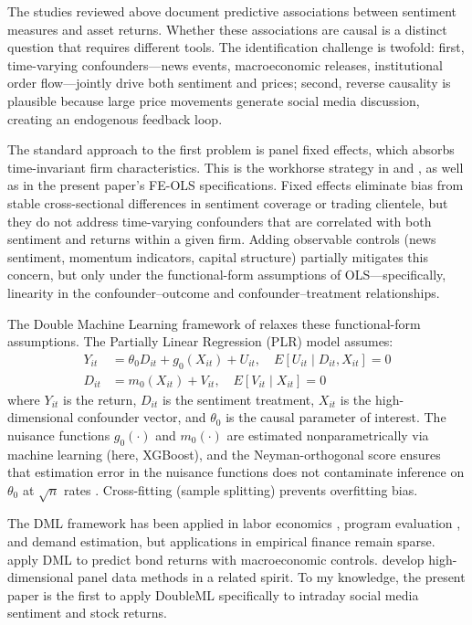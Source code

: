 The studies reviewed above document predictive associations between sentiment measures and asset
returns. Whether these associations are causal is a distinct question that requires different
tools. The identification challenge is twofold: first, time-varying confounders---news events,
macroeconomic releases, institutional order flow---jointly drive both sentiment and prices;
second, reverse causality is plausible because large price movements generate social media
discussion, creating an endogenous feedback loop.

The standard approach to the first problem is panel fixed effects, which absorbs time-invariant
firm characteristics. This is the workhorse strategy in \citet{gu2020} and \citet{teti2019}, as
well as in the present paper's FE-OLS specifications. Fixed effects eliminate bias from stable
cross-sectional differences in sentiment coverage or trading clientele, but they do not address
time-varying confounders that are correlated with both sentiment and returns within a given firm.
Adding observable controls (news sentiment, momentum indicators, capital structure) partially
mitigates this concern, but only under the functional-form assumptions of OLS---specifically,
linearity in the confounder--outcome and confounder--treatment relationships.

The Double Machine Learning framework of \citet{chernozhukov2018} relaxes these functional-form
assumptions. The Partially Linear Regression (PLR) model assumes:
%
\begin{align}
    Y_{it} &= \theta_0 D_{it} + g_0(X_{it}) + U_{it}, \quad E[U_{it} \mid D_{it}, X_{it}] = 0 \label{eq:plr_outcome} \\
    D_{it} &= m_0(X_{it}) + V_{it}, \quad E[V_{it} \mid X_{it}] = 0 \label{eq:plr_treatment}
\end{align}
%
where $Y_{it}$ is the return, $D_{it}$ is the sentiment treatment, $X_{it}$ is the
high-dimensional confounder vector, and $\theta_0$ is the causal parameter of interest. The
nuisance functions $g_0(\cdot)$ and $m_0(\cdot)$ are estimated nonparametrically via machine
learning (here, XGBoost), and the Neyman-orthogonal score ensures that estimation error in the
nuisance functions does not contaminate inference on $\theta_0$ at $\sqrt{n}$ rates
\citep{chernozhukov2018}. Cross-fitting (sample splitting) prevents overfitting bias.

The DML framework has been applied in labor economics \citep{belloni2014}, program evaluation
\citep{knaus2021}, and demand estimation, but applications in empirical finance remain sparse.
\citet{fan2022} apply DML to predict bond returns with macroeconomic controls.
\citet{chetverikov2021} develop high-dimensional panel data methods in a related spirit. To my
knowledge, the present paper is the first to apply DoubleML specifically to intraday social media
sentiment and stock returns.


